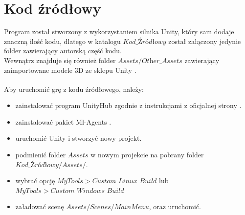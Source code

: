 \section{Kod źródłowy}
    Program został stworzony z wykorzystaniem silnika Unity, który sam dodaje znaczną ilość kodu, 
    dlatego w katalogu $\textit{Kod\_Źródłowy}$ został załączony jedynie folder zawierający autorską część kodu. \\
    Wewnątrz znajduje się również folder $\textit{Assets/Other\_Assets}$ zawierający zaimportowane modele 3D 
    ze sklepu Unity \cite{UnityAssetStore}.\\
    \vspace{2cm}\\
    Aby uruchomić grę z kodu źródłowego, należy:
    \begin{itemize}
        \item zainstalować program UnityHub zgodnie z instrukcjami z oficjalnej strony \cite{UnityInstallation}.
        \item zainstalować pakiet Ml-Agents \cite{UnityMlAgentsInstallation}.
        \item uruchomić Unity i stworzyć nowy projekt.
        \item podmienić folder $Assets$ w nowym projekcie na pobrany folder $\textit{Kod\_Źródłowy/Assets/}$.
        \item wybrać opcję $MyTools > \textit{Custom Linux Build}$ lub $MyTools > \textit{Custom Windows Build}$
        \item załadować scenę $Assets/Scenes/MainMenu$, oraz uruchomić.
    \end{itemize}

